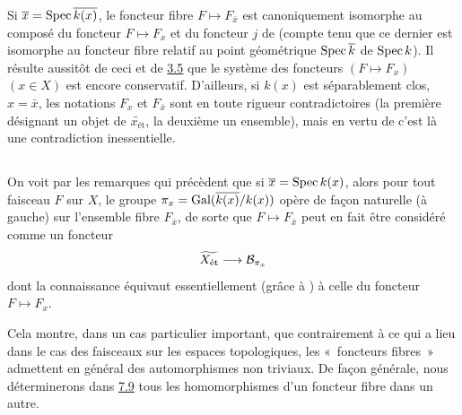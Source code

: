 \documentclass[10pt]{../fichiers-configuration-latex/smfart}
\begin{document}
Si $\overline{x} = \operatorname{Spec} \overline{k(x)}$, le foncteur fibre $F \mapsto
F_{\bar{x}}$ est canoniquement isomorphe au composé du foncteur $F
\mapsto F_x$ et du foncteur $j$ de  (compte tenu que ce dernier est
isomorphe au foncteur fibre relatif au point géométrique $\operatorname{Spec}
\overline{k}$ de $\operatorname{Spec} k$). Il résulte aussitôt de ceci et de
\hyperref[VIII.thm3.5]{3.5} que le
système des foncteurs $(F \mapsto F_x)$ $(x \in X)$ est encore
conservatif. D'ailleurs, si $k(x)$ est séparablement clos, \ie $x =
\bar{x}$, les notations $F_x$ et $F_{\bar{x}}$ sont en toute rigueur
contradictoires (la première désignant un objet de
$\widetilde{x_{\text{ét}}}$, la deuxième un ensemble), mais en vertu de
 c'est là une contradiction inessentielle.

\subsection{}

On voit par les remarques qui précèdent que si $\overline{x} = \operatorname{Spec}
k(x)$, alors pour tout faisceau $F$ sur $X$, le groupe $\pi_x = \operatorname{Gal}
(\overline{k(x)}/ k(x))$ opère de façon naturelle (à gauche) sur
l'ensemble fibre $F_{\bar{x}}$, de sorte que $F \mapsto F_{\bar{x}}$
peut en fait être considéré comme un foncteur
$$
\widetilde{X_{\text{ét}}} \to \Bb_{\pi_x}
$$
dont la connaissance équivaut essentiellement (grâce à
) à celle du
foncteur $F \mapsto F_x$.

Cela montre, dans un cas particulier important, que contrairement à ce
qui a lieu dans le cas des faisceaux sur les espaces topologiques, les
« foncteurs fibres » admettent en général des automorphismes non
triviaux. De façon générale, nous déterminerons dans \hyperref[VIII.thm7.9]{7.9} tous les
homomorphismes d'un foncteur fibre dans un autre.
\end{document}
